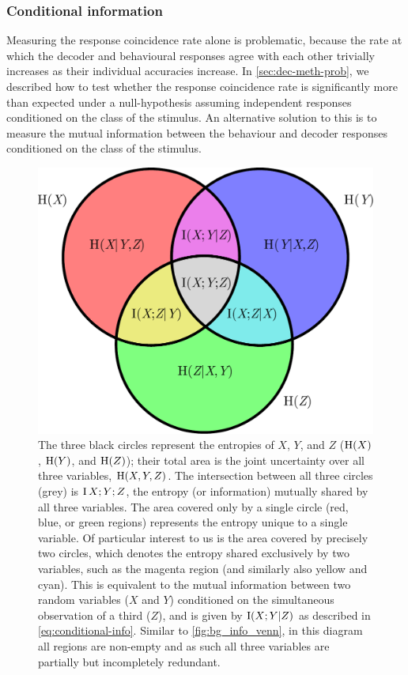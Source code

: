 \subsubsection{Conditional information}

Measuring the response coincidence rate alone is problematic, because the rate at which the decoder and behavioural responses agree with each other trivially increases as their individual accuracies increase.
In \autoref{sec:dec-meth-prob}, we described how to test whether the response coincidence rate is significantly more than expected under a null-hypothesis assuming independent responses conditioned on the class of the stimulus.
An alternative solution to this is to measure the mutual information between the behaviour and decoder responses conditioned on the class of the stimulus.

\begin{figure}[htbp]
\centering
\includegraphics[scale=.425]{figs/venn/conditional-information-diagram.pdf}
\caption{
The three black circles represent the entropies of $X$, $Y$, and $Z$ ($\operatorname{H}(X)$, $\operatorname{H}(Y)$, and $\operatorname{H}(Z)$); their total area is the joint uncertainty over all three variables, $\operatorname{H}(X, Y, Z)$.
The intersection between all three circles (grey) is $\operatorname{I}{X;Y;Z}$, the entropy (or information) mutually shared by all three variables.
The area covered only by a single circle (red, blue, or green regions) represents the entropy unique to a single variable.
Of particular interest to us is the area covered by precisely two circles, which denotes the entropy shared exclusively by two variables, such as the magenta region (and similarly also yellow and cyan).
This is equivalent to the mutual information between two random variables ($X$ and $Y$) conditioned on the simultaneous observation of a third ($Z$), and is given by $\operatorname{I}(X;Y|Z)$ as described in \autoref{eq:conditional-info}.
Similar to \autoref{fig:bg_info_venn}, in this diagram all regions are non-empty and as such all three variables are partially but incompletely redundant.
}
\label{fig:pl_cond_info_venn}
\end{figure}

